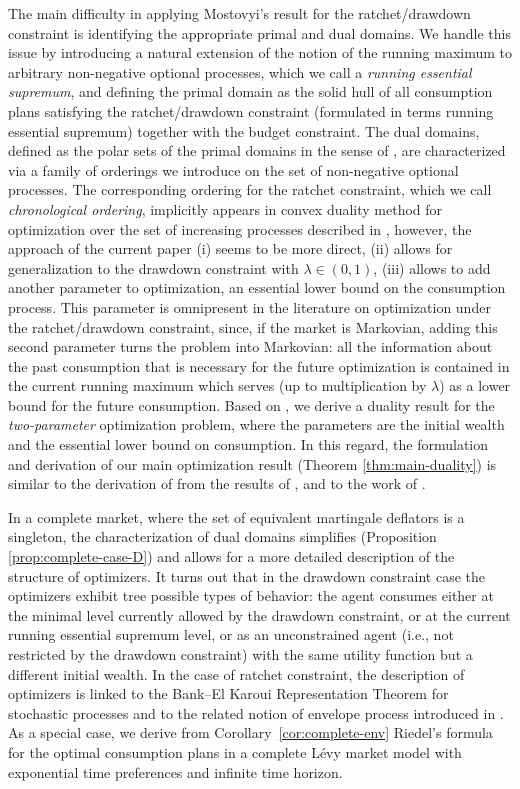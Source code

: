 \documentclass[11pt, oneside]{article}   	%
\theoremstyle{plain}
\theoremstyle{definition}
\theoremstyle{remark}
\begin{document}
The main difficulty in applying Mostovyi's result for the ratchet/drawdown constraint is identifying the appropriate primal and dual domains. We handle this issue by introducing a natural extension of the notion of the running maximum to arbitrary non-negative optional processes, which we call a \textit{running essential supremum}, and defining the primal domain as the solid hull of all consumption plans satisfying the ratchet/drawdown constraint (formulated in terms running essential supremum) together with the budget constraint. The dual domains, defined as the polar sets of the primal domains in the sense of \cite{bipolar}, are characterized via a family of orderings we introduce on the set of non-negative optional processes. The corresponding ordering for the ratchet constraint, which we call \textit{chronological ordering}, implicitly appears in convex duality method for optimization over the set of increasing processes described in \cite{BK}, however, the approach of the current paper (i) seems to be more direct, (ii) allows for generalization to the drawdown constraint with $\lambda\in(0,1)$, (iii) allows to add another parameter to optimization, an essential lower bound on the consumption process. This parameter is omnipresent in the literature on optimization under the ratchet/drawdown constraint, since, if the market is Markovian, adding this second parameter turns the problem into Markovian: all the information about the past consumption that is necessary for the future optimization is contained in the current running maximum which serves (up to multiplication by $\lambda$) as a lower bound for the future consumption. Based on \cite{mostovyi}, we derive a duality result for the \textit{two-parameter} optimization problem, where the parameters are the initial wealth and the essential lower bound on consumption. In this regard, the formulation and derivation of our main optimization result (Theorem \ref{thm:main-duality}) is similar to the derivation of \cite{hug-kramkov} from the results of \cite{Kramkov:1999aa,Kramkov:2003aa}, and to the work of \cite{yu}.

In a complete market, where the set of equivalent martingale deflators is a singleton, the characterization of dual domains simplifies (Proposition \ref{prop:complete-case-D}) and allows for a more detailed description of the structure of optimizers. It turns out that in the drawdown constraint case the optimizers exhibit tree possible types of behavior: the agent consumes either at the minimal level currently allowed by the drawdown constraint, or at the current running essential supremum level, or as an unconstrained agent (i.e., not restricted by the drawdown constraint) with the same utility function but a different initial wealth. In the case of ratchet constraint, the description of optimizers is linked to the Bank--El Karoui Representation Theorem for stochastic processes and to the related notion of envelope process introduced in \cite{BK}. As a special case, we derive from Corollary~\ref{cor:complete-env} Riedel's formula for the optimal consumption plans in a complete L\'evy market model with exponential time preferences and infinite time horizon.
\end{document}
